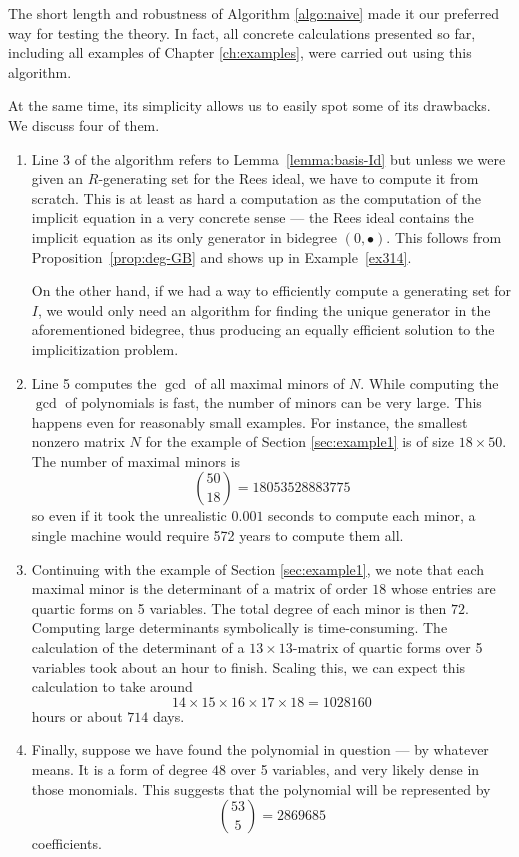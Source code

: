 \documentclass[fleqn,reqno]{amsart}
\numberwithin{first}{chapter}
\begin{document}
\begin{paragraf}
\label{par:flaws}
The short length and robustness of Algorithm \ref{algo:naive} made it our preferred way
for testing the theory.
In fact, all concrete calculations presented so far,
including all examples of Chapter \ref{ch:examples},
were carried out using this algorithm.

At the same time, its simplicity allows us to easily spot some of its drawbacks.
We discuss four of them.
\begin{enumerate}
\item
\label{itm:flaws:GB}
Line 3 of the algorithm refers to Lemma~\ref{lemma:basis-Id} but unless we were given
an $R$-generating set for the Rees ideal,
we have to compute it from scratch.
This is at least as hard a computation as the computation of the implicit equation
in a very concrete sense ---
the Rees ideal contains the implicit equation as its only generator in bidegree $(0,\bullet)$.
This follows from Proposition~\ref{prop:deg-GB} and shows up in Example~\ref{ex314}.

On the other hand, if we had a way to efficiently compute a generating set for $I$,
we would only need an algorithm for finding the unique generator in the aforementioned bidegree,
thus producing an equally efficient solution to the implicitization problem.

\item
\label{itm:flaws:many-minors}
Line 5 computes the $\gcd$ of all maximal minors of $N$.
While computing the $\gcd$ of polynomials is fast,
the number of minors can be very large.
This happens even for reasonably small examples.
For instance, the smallest nonzero matrix $N$ for the example of Section \ref{sec:example1}
is of size $18\times50$.
The number of maximal minors is
\[
	\binom{50}{18}=18053528883775
\]
so even if it took the unrealistic $0.001$ seconds to compute each minor,
a single machine would require 572 years to compute them all.

\item
\label{itm:flaws:large-det}
Continuing with the example of Section \ref{sec:example1},
we note that each maximal minor is the determinant of a matrix of order $18$
whose entries are quartic forms on 5 variables.
The total degree of each minor is then $72$.
Computing large determinants symbolically is time-consuming.
The calculation of the determinant of a $13\times13$-matrix of quartic forms
over 5 variables took about an hour to finish.
Scaling this, we can expect this calculation to take around
\[
	14\times15\times16\times17\times18=1028160
\]
hours or about $714$ days.

\item
\label{itm:flaws:large-poly}
Finally, suppose we have found the polynomial in question --- by whatever means.
It is a form of degree $48$ over 5 variables, and very likely dense in those monomials.
This suggests that the polynomial will be represented by
\[
	\binom{53}{5}=2869685
\]
coefficients.
\end{enumerate}
\end{paragraf}
\end{document}
